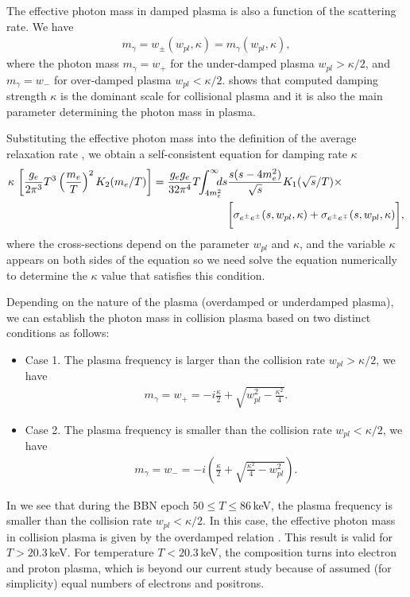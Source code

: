 The effective photon mass in damped plasma is also a function of the scattering rate. We have
\begin{align}\label{PhotonMass:self}
m_\gamma=w_\pm(w_{pl},\kappa)=m_\gamma(w_{pl},\kappa),
\end{align}
where the photon mass $m_\gamma=w_+$ for the under-damped plasma $w_{pl}>\kappa/2$, and $m_\gamma=w_-$ for over-damped plasma $w_{pl}<\kappa/2$.  shows that computed damping strength $\kappa$ is the dominant scale for collisional plasma and it is also the main parameter determining the photon mass in plasma. 

Substituting the effective photon mass  into the definition of the average relaxation rate , we obtain a self-consistent equation for damping rate $\kappa$ 
\begin{align}\label{RealaxtionSelf}
\kappa\,\left[\frac{g_e}{2\pi^3}T^3\left(\frac{m_e}{T}\right)^2K_2(m_e/T)\right]=\frac{g_eg_e}{32\pi^4}T\!\! \int_{4m_e^2}^\infty\!\!\!\!ds&
\frac{s(s-4m^2_e)}{\sqrt{s}}K_1(\sqrt{s}/T)\times\\&\notag
\bigg[\sigma_{e^\pm e^\pm}(s,w_{pl},\kappa)+\sigma_{e^\pm e^\mp}(s,w_{pl},\kappa)\bigg],
\end{align}
where the cross-sections depend on the parameter $w_{pl}$ and $\kappa$, and the variable $\kappa$ appears on both sides of the equation so we need solve the equation numerically to determine the $\kappa$ value that satisfies this condition.

Depending on the nature of the plasma (overdamped or underdamped plasma), we can establish the photon mass in collision plasma based on two distinct conditions as follows:
\begin{itemize}
\item Case 1. The plasma frequency is larger than the collision rate $w_{pl}>\kappa/2$, we have
\begin{align}
m_\gamma=w_+=-i\frac{\kappa}{2}+\sqrt{w^2_{pl}-\frac{\kappa^2}{4}}.
\end{align}
\item Case 2. The plasma frequency is smaller than the collision rate $w_{pl}<\kappa/2$, we have
\begin{align}\label{PhotonMassPlasma}
m_\gamma=w_-=-i\left(\frac{\kappa}{2}+\sqrt{\frac{\kappa^2}{4}-w^2_{pl}}\right).
\end{align}
\end{itemize}
In  we see that during the BBN epoch $50\leqslant T\leqslant 86$\,keV, the plasma frequency is smaller than the collision rate $w_{pl}<\kappa/2$. In this case, the effective photon mass in collision plasma is given by the overdamped relation . This result is valid for $T>20.3$\,keV. For temperature $T<20.3$\,keV, the composition turns into electron and proton plasma, which is beyond our current study because of assumed (for simplicity) equal numbers of electrons and positrons.

